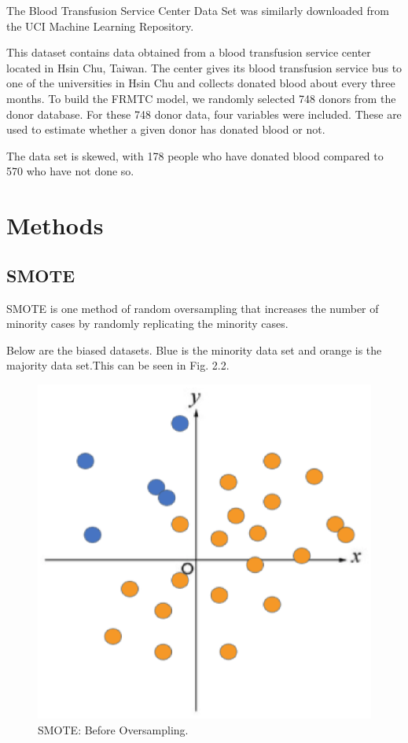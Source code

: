 The Blood Transfusion Service Center Data Set was similarly downloaded from the UCI Machine Learning Repository\cite{Blood}.

This dataset contains data obtained from a blood transfusion service center located in Hsin Chu, Taiwan.
The center gives its blood transfusion service bus to one of the universities in Hsin Chu and collects donated blood about every three months. To build the FRMTC model, we randomly selected 748 donors from the donor database. For these 748 donor data, four variables were included. These are used to estimate whether a given donor has donated blood or not.

The data set is skewed, with 178 people who have donated blood compared to 570 who have not done so.
\clearpage


\section{Methods}
\subsection{SMOTE}

SMOTE is one method of random oversampling that increases the number of minority cases by randomly replicating the minority cases.

Below are the biased datasets.
Blue is the minority data set and orange is the majority data set.This can be seen in Fig. 2.2.

\begin{center}
    \begin{figure}[ht]
        \caption{SMOTE: Before Oversampling.}
        \label{tab:team-rating-features}
        \begin{center}
            \includegraphics[scale=0.6]{image/smote1.eps}
        \end{center}
    \end{figure}
\end{center}

